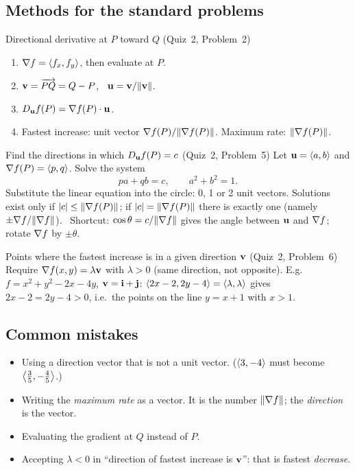 \subsection*{Methods for the standard problems}

\begin{strategy}{Directional derivative at $P$ toward $Q$ (Quiz~2, Problem~2)}
\begin{enumerate}
\item $\nabla f=\left\langle f_x,f_y \right\rangle$, then evaluate at $P$.
\item $\mathbf{v}=\overrightarrow{PQ}=Q-P$, \ $\mathbf{u}=\mathbf{v}/\lVert\mathbf{v}\rVert$.
\item $D_{\mathbf{u}} f(P)=\nabla f(P)\cdot\mathbf{u}$.
\item Fastest increase: unit vector $\nabla f(P)/\lVert\nabla f(P)\rVert$. Maximum rate: $\lVert\nabla f(P)\rVert$.
\end{enumerate}
\end{strategy}

\begin{strategy}{Find the directions in which $D_{\mathbf{u}} f(P)=c$ (Quiz~2, Problem~5)}
Let $\mathbf{u}=\left\langle a,b \right\rangle$ and $\nabla f(P)=\left\langle p,q \right\rangle$. Solve the system
\[ pa+qb=c,\qquad a^2+b^2=1. \]
Substitute the linear equation into the circle: 0, 1 or 2 unit vectors. Solutions exist only if
$\lvert c\rvert\le\lVert\nabla f(P)\rVert$; if $\lvert c\rvert=\lVert\nabla f(P)\rVert$ there is exactly one (namely
$\pm\nabla f/\lVert\nabla f\rVert$). \ Shortcut: $\cos\theta=c/\lVert\nabla f\rVert$ gives the angle between
$\mathbf{u}$ and $\nabla f$; rotate $\nabla f$ by $\pm\theta$.
\end{strategy}

\begin{strategy}{Points where the fastest increase is in a given direction $\mathbf{v}$ (Quiz~2, Problem~6)}
Require $\nabla f(x,y)=\lambda\mathbf{v}$ with $\lambda>0$ (same direction, not opposite). E.g.\
$f=x^2+y^2-2x-4y$, $\mathbf{v}=\mathbf{i}+\mathbf{j}$: $\left\langle 2x-2,2y-4 \right\rangle=\left\langle \lambda,\lambda \right\rangle$ gives
$2x-2=2y-4>0$, i.e.\ the points on the line $y=x+1$ with $x>1$.
\end{strategy}

\subsection*{Common mistakes}
\begin{itemize}
\item Using a direction vector that is not a unit vector. ($\left\langle 3,-4 \right\rangle$ must become $\left\langle \frac35,-\frac45 \right\rangle$.)
\item Writing the \emph{maximum rate} as a vector. It is the number $\lVert\nabla f\rVert$; the
  \emph{direction} is the vector.
\item Evaluating the gradient at $Q$ instead of $P$.
\item Accepting $\lambda<0$ in ``direction of fastest increase is $\mathbf{v}$'': that is fastest \emph{decrease}.
\end{itemize}
